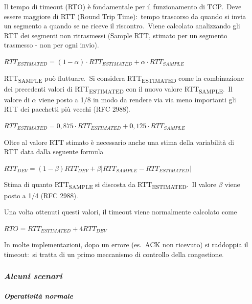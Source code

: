 Il tempo di timeout (RTO) è fondamentale per il funzionamento di TCP.\
Deve essere maggiore di RTT (Round Trip Time):\ tempo trascorso da quando si invia un segmento a quando se ne riceve il riscontro.\
Viene calcolato analizzando gli RTT dei segmenti non ritrasmessi (Sample RTT, stimato per un segmento trasmesso - non per ogni invio).

\begin{center}
    $RTT_{ESTIMATED} = (1-\alpha) \cdot RTT_{ESTIMATED} + \alpha \cdot RTT_{SAMPLE}$
\end{center}
RTT\textsubscript{SAMPLE} può fluttuare.\
Si considera RTT\textsubscript{ESTIMATED} come la combinazione dei precedenti valori di RTT\textsubscript{ESTIMATED} con il nuovo valore RTT\textsubscript{SAMPLE}.\
Il valore di $\alpha $ viene posto a 1/8 in modo da rendere via via meno importanti gli RTT dei pacchetti più vecchi (RFC 2988).

\begin{center}
    $RTT_{ESTIMATED} = 0,875 \cdot RTT_{ESTIMATED} + 0,125 \cdot RTT_{SAMPLE}$
\end{center}

Oltre al valore RTT stimato è necessario anche una stima della variabilità di RTT data dalla seguente formula

\begin{center}
    $RTT_{DEV} = (1-\beta)RTT_{DEV} + \beta|RTT_{SAMPLE} - RTT_{ESTIMATED}|$
\end{center}
Stima di quanto RTT\textsubscript{SAMPLE} si discosta da RTT\textsubscript{ESTIMATED}.\
Il valore $\beta$ viene posto a 1/4 (RFC 2988).

Una volta ottenuti questi valori, il timeout viene normalmente calcolato come

\begin{center}
    $RTO = RTT_{ESTIMATED} + 4RTT_{DEV}$
\end{center}
In molte implementazioni, dopo un errore (es.\
ACK non ricevuto) si raddoppia il timeout:\ si tratta di un primo meccanismo di controllo della congestione.

\subsubsection{\emph{Alcuni scenari}}

\paragraph{\emph{Operatività normale}}

